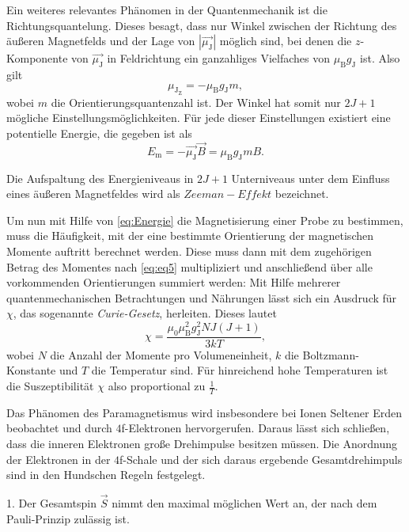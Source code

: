 Ein weiteres relevantes Phänomen in der Quantenmechanik ist die Richtungsquantelung. Dieses besagt, dass nur Winkel zwischen der Richtung des äußeren Magnetfelds und der Lage von
$\left|\vec{\mu_\text{J}}\right|$ möglich sind, bei denen die $z$-Komponente von $\vec{\mu_\text{J}}$ in Feldrichtung ein ganzahliges Vielfaches von $\mu_\text{B}g_\text{J}$ ist.
Also gilt
\begin{equation}
\label{eq:eq5}
\mu_{\text{J}_\text{Z}} = - \mu_\text{B}g_\text{J}m,
\end{equation}
wobei $m$ die Orientierungsquantenzahl ist. Der Winkel hat somit nur $2J+1$ mögliche Einstellungsmöglichkeiten. Für jede dieser Einstellungen existiert eine potentielle Energie,
die gegeben ist als
\begin{equation*}
	\label{eq:Energie}
E_\text{m} = - \vec{\mu_\text{J}}\vec{B} = \mu_\text{B}g_\text{J}mB.
\end{equation*}

Die Aufspaltung des Energieniveaus in $2J+1$ Unterniveaus unter dem Einfluss eines äußeren Magnetfeldes wird als $\mathit{Zeeman-Effekt}$ bezeichnet.

Um nun mit Hilfe von \autoref{eq:Energie} die Magnetisierung einer Probe zu bestimmen, muss die Häufigkeit, mit der eine bestimmte Orientierung der magnetischen Momente auftritt berechnet
werden. Diese muss dann mit dem zugehörigen Betrag des Momentes nach \autoref{eq:eq5} multipliziert und anschließend über alle vorkommenden Orientierungen summiert werden:
Mit Hilfe mehrerer quantenmechanischen Betrachtungen und Nährungen lässt sich ein Ausdruck für $\chi$, das sogenannte \textit{Curie-Gesetz}, herleiten.
Dieses lautet
\begin{equation}
\label{eq:mariecurie}
\chi = \frac{\mu_0\mu_\text{B}^{2}g_\text{J}^{2}NJ(J+1)}{3kT},
\end{equation}
wobei $N$ die Anzahl der Momente pro Volumeneinheit, $k$ die Boltzmann-Konstante und $T$ die Temperatur sind.
Für hinreichend hohe Temperaturen ist die Suszeptibilität $\chi$ also proportional zu $\frac{1}{T}$.

Das Phänomen des Paramagnetismus wird insbesondere bei Ionen Seltener Erden beobachtet und durch $4$f-Elektronen hervorgerufen. Daraus lässt sich schließen, dass die
inneren Elektronen große Drehimpulse besitzen müssen. Die Anordnung der Elektronen in der $4$f-Schale und der sich daraus ergebende Gesamtdrehimpuls sind in den Hundschen Regeln
festgelegt. 

1. Der Gesamtspin $\vec{S}$ nimmt den maximal möglichen Wert an, der nach dem Pauli-Prinzip zulässig ist. 


